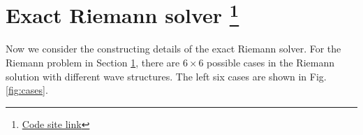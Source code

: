 \documentclass[review]{elsarticle}
\begin{document}
\section{Exact Riemann solver \footnote{\href{https://nbviewer.jupyter.org/github/bfly123/Exact-Elastic-plastic-Riemann-Solver-/blob/master/\%20CharacteristicForPlasticStateAfterYielding.ipynb\#}{Code site link}}} \label{sec:riemann}


Now we consider the constructing details of the exact  Riemann  solver. For  the Riemann problem in Section \ref{sec:riemann}, there are  $6\times 6$ possible  cases in the Riemann solution with different wave structures.  The left six cases are  shown in Fig.\ref{fig:cases}. 
\end{document}
